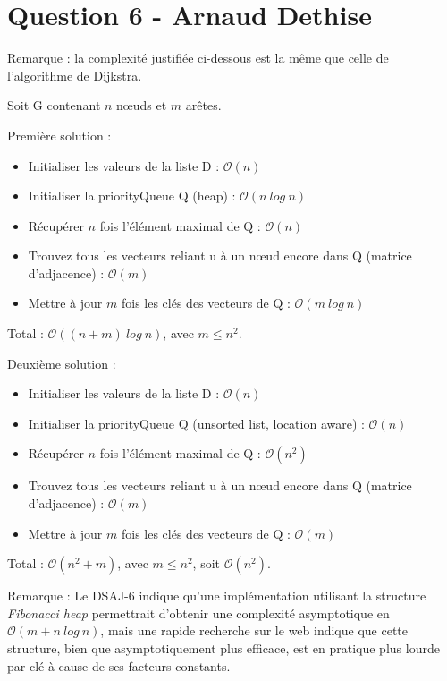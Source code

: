 \documentclass[10pt,a4paper]{article}
\begin{document}
\section*{Question 6 - Arnaud Dethise}

	Remarque : la complexité justifiée ci-dessous est la même que celle de l'algorithme de Dijkstra.

	Soit G contenant $n$ nœuds et $m$ arêtes.
	
	\vspace{0.3cm}
	Première solution :
	\begin{itemize}
	\item Initialiser les valeurs de la liste D : $\mathcal{O}(n)$
	\item Initialiser la priorityQueue Q (heap) : $\mathcal{O}(n~log~n)$
	\item Récupérer $n$ fois l'élément maximal de Q : $\mathcal{O}(n)$
	\item Trouvez tous les vecteurs reliant u à un nœud encore dans Q (matrice d'adjacence) : $\mathcal{O}(m)$
	\item Mettre à jour $m$ fois les clés des vecteurs de Q : $\mathcal{O}(m~log~n)$
	\end{itemize}
	Total : $\mathcal{O}((n+m)~log~n)$, avec $m \leq n^2$.
	
	\vspace{0.3cm}	
	Deuxième solution :
	\begin{itemize}
	\item Initialiser les valeurs de la liste D : $\mathcal{O}(n)$
	\item Initialiser la priorityQueue Q (unsorted list, location aware) : $\mathcal{O}(n)$
	\item Récupérer $n$ fois l'élément maximal de Q : $\mathcal{O}(n^2)$
	\item Trouvez tous les vecteurs reliant u à un nœud encore dans Q (matrice d'adjacence) : $\mathcal{O}(m)$
	\item Mettre à jour $m$ fois les clés des vecteurs de Q : $\mathcal{O}(m)$
	\end{itemize}
	Total : $\mathcal{O}(n^2 + m)$, avec $m \leq n^2$, soit $\mathcal{O}(n^2)$.
	
	\vspace{0.5cm}
	Remarque : Le DSAJ-6 indique qu'une implémentation utilisant la structure \textit{Fibonacci heap} permettrait d'obtenir une complexité asymptotique en $\mathcal{O}(m + n~log~n)$, mais une rapide recherche sur le web indique que cette structure, bien que asymptotiquement plus efficace, est en pratique plus lourde par clé à cause de ses facteurs constants.

\end{document}
